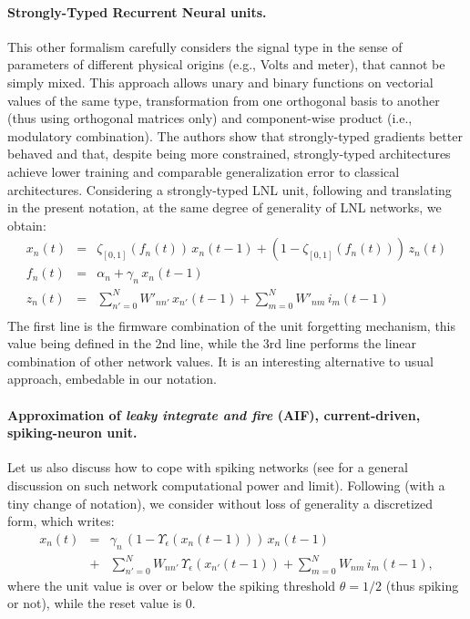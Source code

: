 \paragraph{Strongly-Typed Recurrent Neural units.} 

This other formalism \cite{Balduzzi:2016} carefully considers the signal type in the sense of parameters of different physical origins (e.g., Volts and meter), that cannot be simply mixed. This approach allows unary and binary functions on vectorial values of the same type, transformation from one orthogonal basis to another (thus using orthogonal matrices only) and component-wise product (i.e., modulatory combination). The authors show that strongly-typed gradients better behaved and that, despite being more constrained, strongly-typed architectures achieve lower training and comparable
generalization error to classical architectures. Considering a strongly-typed LNL unit, following \cite{Balduzzi:2016} and translating in the present notation, at the same degree of generality of LNL networks, we obtain:
\begin{equation}\label{st-lnl-network}\begin{array}{rcll}
  x_n(t) &=& \zeta_{[0,1]}\left(f_n(t)\right) \, x_n(t-1) + \left(1 - \zeta_{[0,1]}\left(f_n(t)\right)\right) \, z_n(t) \\
  f_n(t) &=& \alpha_n + \gamma_n \,  x_n(t-1) \\
  z_n(t) &=& \sum_{n' = 0}^{N} W'_{nn'} \, x_{n'}(t-1) + \sum_{m = 0}^{N} W'_{nm} \, i_m(t-1) \\
\end{array}\end{equation}
The first line is the firmware combination of the unit forgetting mechanism, this value being defined in the 2nd line, while the 3rd line performs the linear combination of other network values.
It is an interesting alternative to usual approach, embedable in our notation.

\paragraph{Approximation of {\em leaky integrate and fire} (AIF), current-driven, spiking-neuron unit.}

Let us also discuss how to cope with spiking networks (see \cite{cessac-paugam-moisy-etal:10} for a general discussion on such network computational power and limit).
 Following \cite{cessac_discrete_2008} (with a tiny change of notation), we consider without loss of generality a discretized form, which writes: \begin{equation}\label{lif-network} \begin{array}{rcl}x_n(t) &=& \gamma_n \, \left(1 - \Upsilon_\epsilon\left(x_n(t-1)\right)\right) \,x_n(t-1) \\ &+& \sum_{n' = 0}^{N} W_{nn'} \, \Upsilon_\epsilon\left(x_{n'}(t-1)\right) + \sum_{m = 0}^{N} W_{nm} \, i_m(t-1), \end{array}\end{equation} 
where the unit value is over or below the spiking threshold $\theta = 1/2$ (thus spiking or not), while the reset value is $0$.

